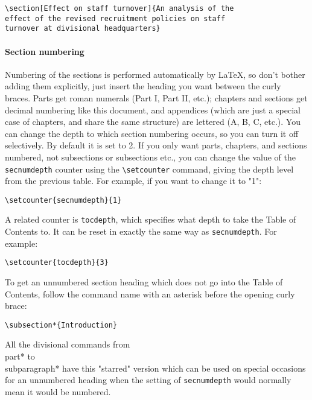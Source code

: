 \begin{lstlisting}
\section[Effect on staff turnover]{An analysis of the
effect of the revised recruitment policies on staff
turnover at divisional headquarters}
\end{lstlisting}

\paragraph{ Section numbering }
Numbering of the sections is performed automatically by LaTeX, so don't bother
adding them explicitly, just insert the heading you want between the curly
braces.  Parts get roman numerals (Part I, Part II, etc.); chapters and
sections get decimal numbering like this document, and appendices (which are
just a special case of chapters, and share the same structure) are lettered (A,
B, C, etc.). You can change the depth to which section numbering occurs, so you
can turn it off selectively. By default it is set to 2. If you only want parts,
chapters, and sections numbered, not subsections or subsections etc., you can
change the value of the \texttt{secnumdepth} counter using the
\verb+\setcounter+ command, giving the depth level from the previous table.
For example, if you want to change it to "1":
\begin{lstlisting}
\setcounter{secnumdepth}{1}
\end{lstlisting}

A related counter is \texttt{tocdepth}, which specifies what depth to take the
Table of Contents to. It can be reset in exactly the same way as
\texttt{secnumdepth}. For example:
\begin{lstlisting}
\setcounter{tocdepth}{3}
\end{lstlisting}

To get an unnumbered section heading which does not go into the Table of
Contents, follow the command name with an asterisk before the opening curly
brace:
\begin{lstlisting}
\subsection*{Introduction}
\end{lstlisting}

All the divisional commands from \\part* to \\subparagraph* have this "starred"
version which can be used on special occasions for an unnumbered heading when
the setting of \texttt{secnumdepth} would normally mean it would be numbered.

